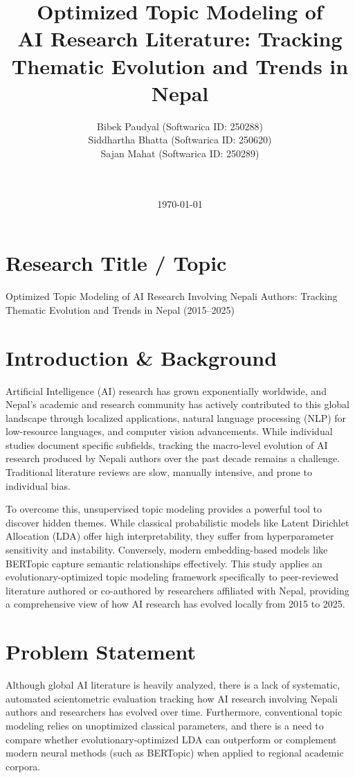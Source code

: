 \documentclass[11pt,a4paper]{article}
\title{\textbf{Optimized Topic Modeling of \\AI Research Literature:
Tracking Thematic Evolution and Trends in Nepal }}
\author{
  Bibek Paudyal \quad (Softwarica ID: 250288) \\
  Siddhartha Bhatta \quad (Softwarica ID: 250620) \\
  Sajan Mahat \quad (Softwarica ID: 250289) \\[1em]
  \text{Module: ST7085CEM - Advanced Machine Learning} \\
  \text{Softwarica College of IT \& E-Commerce}\\
  \text{(Affiliated to Coventry University)}
}
\date{\today}
\begin{document}
\twocolumn[
  \maketitle
]

\section{Research Title / Topic}
Optimized Topic Modeling of AI Research Involving Nepali Authors:
Tracking Thematic Evolution and Trends in Nepal (2015--2025)

\section{Introduction \& Background}
Artificial Intelligence (AI) research has grown exponentially worldwide,
and Nepal's academic and research community has actively contributed to
this global landscape through localized applications, natural language
processing (NLP) for low-resource languages, and computer vision
advancements. While individual studies document specific subfields,
tracking the macro-level evolution of AI research produced by Nepali
authors over the past decade remains a challenge. Traditional literature
reviews are slow, manually intensive, and prone to individual bias.

To overcome this, unsupervised topic modeling provides a powerful tool to
discover hidden themes. While classical probabilistic models like Latent
Dirichlet Allocation (LDA) offer high interpretability, they suffer from
hyperparameter sensitivity and instability. Conversely, modern
embedding-based models like BERTopic capture semantic relationships
effectively. This study applies an evolutionary-optimized topic modeling
framework specifically to peer-reviewed literature authored or
co-authored by researchers affiliated with Nepal, providing a
comprehensive view of how AI research has evolved locally from 2015 to
2025.

\section{Problem Statement}
Although global AI literature is heavily analyzed, there is a lack of
systematic, automated scientometric evaluation tracking how AI research
involving Nepali authors and researchers has evolved over time.
Furthermore, conventional topic modeling relies on unoptimized classical
parameters, and there is a need to compare whether
evolutionary-optimized LDA can outperform or complement modern neural
methods (such as BERTopic) when applied to regional academic corpora.
\end{document}
